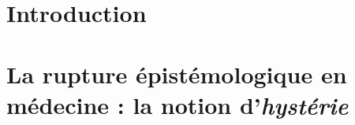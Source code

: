 \documentclass[a4paper,12pt]{book}
\begin{document}
\reversemarginpar %

\newcommand{\HRule}{\rule{\linewidth}{0.5mm}}
\onehalfspacing

%
%
%
%
%


\clearpage
\pagestyle{empty} %
\tableofcontents
%
%

\clearpage
\pagestyle{fancy}
\setcounter{page}{1} %






\renewcommand{\arraystretch}{1.5}


~
\thispagestyle{empty}
\setcounter{page}{0}
\newpage



\chapter{Introduction}



\chapter{La rupture épistémologique en médecine : la notion d'\textit{hystérie}}

\end{document}
